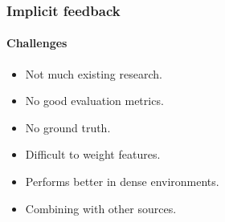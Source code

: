 \documentclass{beamer}
\begin{document}
  \begin{frame}
    \frametitle{Implicit feedback}
    \framesubtitle{Challenges}
    \begin{itemize}
      \item Not much existing research.
      \item No good evaluation metrics.
      \item No ground truth.
      \item Difficult to weight features.
      \item Performs better in dense environments.
      \item Combining with other sources.
    \end{itemize}
  \end{frame}

\end{document}
